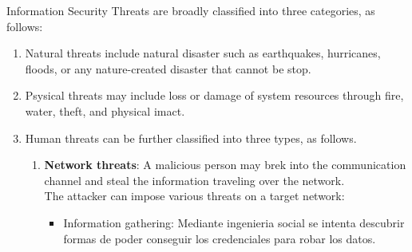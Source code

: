 Information Security Threats are broadly classified into three categories, as follows:

\begin{enumerate}
	\item Natural threats include natural disaster such as earthquakes, hurricanes, floods, or any nature-created disaster that cannot be stop.
	\item Psysical threats may include loss or damage of system resources through fire, water, theft, and physical imact.
	\item Human threats can be further classified into three types, as follows.
	\begin{enumerate}
		\item \textbf{Network threats}: A malicious person may brek into the communication channel and steal the information traveling over the network.\\
		The attacker can impose various threats on a target network:
		\begin{itemize}
			\item Information gathering: Mediante ingenieria social se intenta descubrir formas de poder conseguir los credenciales para robar los datos.
			

\end{itemize}
\end{enumerate}
\end{enumerate}
